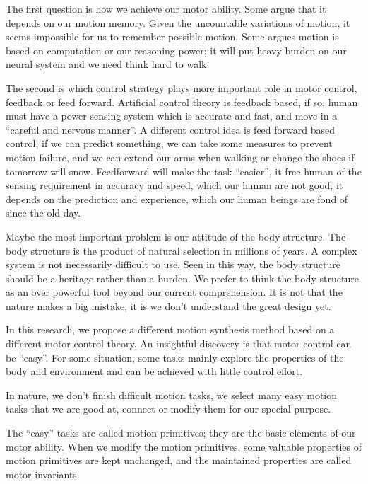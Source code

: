 \begin{itemize}
The first question is how we achieve our motor ability. Some argue that it depends on our motion memory. Given the uncountable variations of motion, it seems impossible for us to remember possible motion. Some argues motion is based on computation or our reasoning power; it will put heavy burden on our neural system and we need think hard to walk.
	
The second is which control strategy plays more important role in motor control, feedback or feed forward. Artificial control theory is feedback based, if so, human must have a power sensing system which is accurate and fast, and move in a “careful and nervous manner”. 
A different control idea is feed forward based control, if we can predict something, we can take some measures to prevent motion failure, and we can extend our arms when walking or change the shoes if tomorrow will snow.
Feedforward will make the task “easier”, it free human of the sensing requirement in accuracy and speed, which our human are not good, it depends on the prediction and experience, which our human beings are fond of since the old day.
	
Maybe the most important problem is our attitude of the body structure. The body structure is the product of natural selection in millions of years. A complex system is not necessarily difficult to use. Seen in this way, the body structure should be a heritage rather than a burden.  We prefer to think the body structure as an over powerful tool beyond our current comprehension. 
It is not that the nature makes a big mistake; it is we don’t understand the great design yet.

\end{itemize}
In this research, we propose a different motion synthesis method based on a different motor control theory.
 An insightful discovery is that motor control can be “easy”.
For some situation, some tasks mainly explore the properties of the body and environment and can be achieved with little control effort.
 
In nature, we don’t finish difficult motion tasks, we select many easy motion tasks that we are good at, connect or modify them for our special purpose.

The “easy” tasks are called motion primitives; they are the basic elements of our motor ability. 
When we modify the motion primitives, some valuable properties of motion primitives are kept unchanged, and the maintained properties are called motor invariants.

